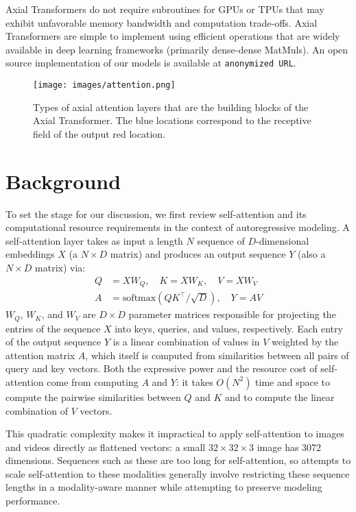 \documentclass{article} \usepackage{iclr2020_conference,times}
\begin{document}
Axial Transformers do not require subroutines for GPUs or TPUs that may exhibit unfavorable memory bandwidth and computation trade-offs. Axial Transformers are simple to implement using efficient operations that are widely available in deep learning frameworks (primarily dense-dense MatMuls). An open source implementation of our models is available at \texttt{anonymized URL}. 



\begin{figure}[t]
    \centering
    \texttt{[image: images/attention.png]}
    \caption{Types of axial attention layers that are the building blocks of the Axial Transformer. The blue locations correspond to the receptive field of the output red location.}
    \label{fig:attention_building_blocks}
\end{figure}

\section{Background}


To set the stage for our discussion, we first review self-attention and its computational resource requirements in the context of autoregressive modeling. A self-attention layer takes as input a length $N$ sequence of $D$-dimensional embeddings $X$ (a $N \times D$ matrix) and produces an output sequence $Y$ (also a $N \times D$ matrix) via:
\begin{align*}
Q &= X W_Q, \quad K = X W_K, \quad V = X W_V \\
A &= \text{softmax} \left( QK^\top / \sqrt{D} \right) , \quad Y = A V
\end{align*}
$W_Q$, $W_K$, and $W_V$ are $D \times D$ parameter matrices responsible for projecting the entries of the sequence $X$ into keys, queries, and values, respectively. Each entry of the output sequence $Y$ is a linear combination of values in $V$ weighted by the attention matrix $A$, which itself is computed from similarities between all pairs of query and key vectors.
Both the expressive power and the resource cost of self-attention come from computing $A$ and $Y$: it takes $O(N^2)$ time and space to compute the pairwise similarities between $Q$ and $K$ and to compute the linear combination of $V$ vectors.

This quadratic complexity makes it impractical to apply self-attention to images and videos directly as flattened vectors: a small $32\times 32 \times 3$ image has 3072 dimensions. Sequences such as these are too long for self-attention, so attempts to scale self-attention to these modalities generally involve restricting these sequence lengths in a modality-aware manner while attempting to preserve modeling performance.
\end{document}
